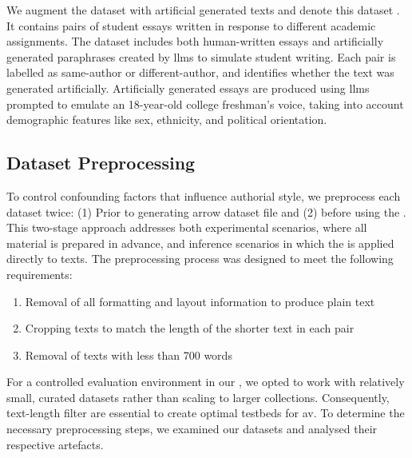 
We augment the \dataStudent{} dataset with artificial generated texts and denote this dataset \dataArtificialStudent{}.
It contains pairs of student essays written in response to different academic assignments. 
The dataset includes both human-written essays and artificially generated paraphrases created by \acp{llm} to simulate student writing. 
Each pair is labelled as same-author or different-author, and identifies whether the text was generated artificially. 
Artificially generated essays are produced using \acp{llm} prompted to emulate an 18-year-old college freshman's voice, taking into account demographic features like sex, ethnicity, and political orientation.

\subsection{Dataset Preprocessing}
\label{subsec:dataset_preprocessing}

To control confounding factors that influence authorial style, we preprocess each dataset twice:
(1) Prior to generating arrow dataset file and (2) before using the \impAppr{}.
This two-stage approach addresses both experimental scenarios, where all material is prepared in advance, and inference scenarios in which the \impAppr{} is applied directly to texts.
The preprocessing process was designed to meet the following requirements:
\begin{enumerate}
    \item Removal of all formatting and layout information to produce plain text
    \item Cropping texts to match the length of the shorter text in each pair
    \item Removal of texts with less than 700 words
\end{enumerate}
For a controlled evaluation environment in our \impAppr{}, we opted to work with relatively small, curated datasets rather than scaling to larger collections.  
Consequently, text-length filter are essential to create optimal testbeds for \ac{av}.
To determine the necessary preprocessing steps, we examined our datasets and analysed their respective artefacts.


